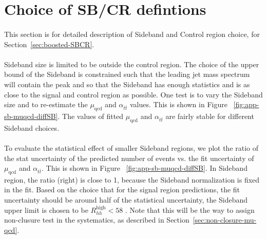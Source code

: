 \section{Choice of SB/CR defintions} %
\label{app:SB-optimization}

\paragraph{}
This section is for detailed description of Sideband and Control region choice, for Section~\ref{sec:boosted-SBCR}.

\paragraph{} 
Sideband size is limited to be outside the control region. The choice of the upper bound of the Sideband is constrained such that the leading jet mass spectrum will contain the \ttbar peak and so that the Sideband has enough statistics and is as close to the signal and control region as possible. One test is to vary the Sideband size and to re-estimate the $\mu_{\text{qcd}}$ and $\alpha_{t\bar{t}}$ values. This is shown in Figure ~\ref{fig:app-sb-muqcd-diffSB}. The values of fitted $\mu_{\text{qcd}}$ and $\alpha_{t\bar{t}}$ are fairly stable for different Sideband choices.

\paragraph{} 
To evaluate the statistical effect of smaller Sideband regions, we plot the ratio of the stat uncertainty of the predicted number of events vs. the fit uncertainty of $\mu_{\text{qcd}}$ and $\alpha_{t\bar{t}}$. This is shown in Figure ~\ref{fig:app-sb-muqcd-diffSB}. In Sideband region, the ratio (right) is close to 1, because the Sideband normalization is fixed in the fit. Based on the choice that for the signal region predictions, the fit uncertainty should be around half of the statistical uncertainty, the Sideband upper limit is chosen to be $R_{hh}^{\text{high}} < 58$ \GeV. Note that this will be the way to assign non-clusure test in the systematics, as described in Section~\ref{sec:non-closure-mu-qcd}.

